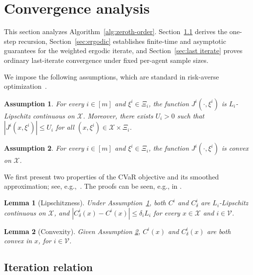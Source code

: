 \documentclass[twocolumn]{autart}    %
\newtheorem{lemma}{Lemma}
\newtheorem{assumption}{Assumption}
\newcommand{\1}{\mathbf{1}}
\begin{document}
\section{Convergence analysis}\label{sec:analysis}

This section analyzes Algorithm~\ref{alg:zeroth-order}. Section~\ref{sec:iteration} derives the one-step recursion, Section~\ref{sec:ergodic} establishes finite-time and asymptotic guarantees for the weighted ergodic iterate, and Section~\ref{sec:last iterate} proves ordinary last-iterate convergence under fixed per-agent sample sizes.
 
We impose the following assumptions, which are standard in risk-averse optimization~\cite{cardoso2019risk,wang2022risk}.
\begin{assumption}\label{assumption:Lipschitz}
For every $i\in[m]$ and $\xi^i\in\Xi_i$, the function $J^i(\cdot,\xi^i)$ is $L_i$-Lipschitz continuous on $\mathcal X$. Moreover, there exists $U_i>0$ such that $|J^i(x,\xi^i)|\le U_i$ for all $(x,\xi^i)\in\mathcal X\times\Xi_i$.
\end{assumption}
\begin{assumption}\label{assumption:convex}
For every $i\in[m]$ and $\xi^i\in\Xi_i$, the function $J^i(\cdot,\xi^i)$ is convex on $\mathcal X$.
\end{assumption}

We first present two properties of the CVaR objective and its smoothed approximation; see, e.g.,~\cite{cardoso2019risk}.  
The proofs can be seen, e.g., in \cite{cardoso2019risk}. 
\begin{lemma}[Lipschitzness]\label{lemma:smoothed cvar Lipschitz} 
Under Assumption~\ref{assumption:Lipschitz}, both $C^i$ and $C_\delta^i$ are $L_i$-Lipschitz continuous on $\mathcal X$, and $|C_\delta^i(x)-C^i(x)|\le\delta_iL_i$ for every $x\in\mathcal X$ and $i\in\mathcal V$. 
\end{lemma} 
\begin{lemma}[Convexity]\label{lemma:cvar convex}
Given Assumption \ref{assumption:convex}, $C^i(x)$ and $C_\delta^i(x)$ are both convex in $x$, for $i\in\mathcal{V}$. 
\end{lemma} 





\subsection{Iteration relation}\label{sec:iteration}
\end{document}
